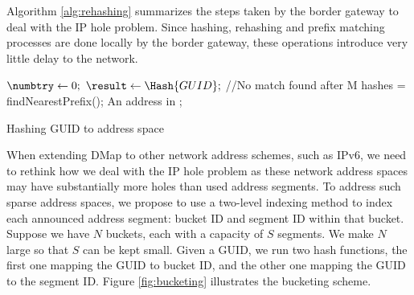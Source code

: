 Algorithm \ref{alg:rehashing} summarizes the steps taken by the border gateway to deal with the IP hole problem. Since hashing, rehashing and prefix matching processes are done locally by the border gateway, these operations introduce very little delay to the network.
       {
        \begin{algorithm}
            \small
            \SetAlFnt{\small\sf}
            \BlankLine
            $\numbtry \leftarrow 0 ;$\;
            $\result \leftarrow \Hash{GUID};$\;
            //No match found after M hashes\;            
	         \nearestPrefixID = findNearestPrefix(\result); 
			\BlankLine
            \Return An address in \nearestPrefixID;
         \caption{Hashing GUID to address space} \label{alg:rehashing}
        \end{algorithm}\vspace{-12pt}
        }

When extending DMap to other network address schemes, such as IPv6, we need to rethink how we deal with the IP hole problem as these network address spaces may have substantially more holes than used address segments. To address such sparse address spaces, we propose to use a two-level indexing method to index each announced address segment: bucket ID and segment ID within that bucket. Suppose we have $N$ buckets, each with a capacity of $S$ segments. We make $N$ large so that $S$ can be kept small. Given a GUID, we run two hash functions, the first one mapping the GUID to bucket ID, and the other one mapping the GUID to the segment ID. Figure \ref{fig:bucketing} illustrates the bucketing scheme.

